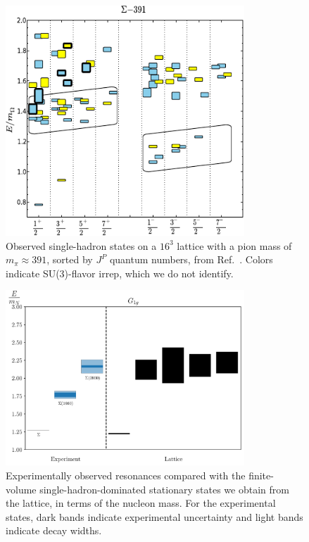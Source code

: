 \begin{figure}[H]
    \centering
    \hspace*{-1cm}\includegraphics[width=0.8\textwidth]{figures/edwards.pdf}
    \caption[Observed single-hadron states on a $16^3$ lattice with a pion mass of $m_\pi \approx 391$, sorted by $J^P$ quantum numbers, from Ref.~\cite{Edwards:2012fx}.]{Observed single-hadron states on a $16^3$ lattice with a pion mass of $m_\pi \approx 391$, sorted by $J^P$ quantum numbers, from Ref.~\cite{Edwards:2012fx}. Colors indicate SU(3)-flavor irrep, which we do not identify.}\label{fig:edwards}
\end{figure}

\begin{figure}[H]
    \centering
    \includegraphics[width=0.8\textwidth]{figures/sigmas/g1g/expvslat.pdf}
    \caption[Experimentally observed resonances compared with the finite-volume single-hadron-dominated stationary states we obtain from the lattice in $G_{1g}$, in terms of the nucleon mass.]{Experimentally observed resonances compared with the finite-volume single-hadron-dominated stationary states we obtain from the lattice, in terms of the nucleon mass. For the experimental states, dark bands indicate experimental uncertainty and light bands indicate decay widths.}\label{fig:g1g_exp}
\end{figure}

